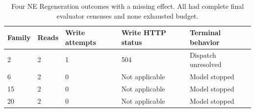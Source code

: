 \begin{table}[t]
\centering
\caption{Four NE Regeneration outcomes with a missing effect. All had complete final evaluator censuses and none exhausted budget.}
\label{tab:s-github-missing}
\begin{tabular}{@{}lllll@{}}
\toprule
Family & Reads & Write attempts & Write HTTP status & Terminal behavior \\
\midrule
2 & 2 & 1 & 504 & Dispatch unresolved \\
6 & 2 & 0 & Not applicable & Model stopped \\
15 & 2 & 0 & Not applicable & Model stopped \\
20 & 2 & 0 & Not applicable & Model stopped \\
\bottomrule
\end{tabular}
\end{table}
